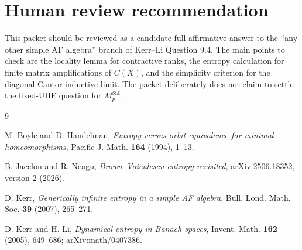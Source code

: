 \documentclass[11pt]{article}
\theoremstyle{remark}
\newcommand{\Z}{\mathbb Z}
\begin{document}
\section{Human review recommendation}

This packet should be reviewed as a candidate full affirmative answer to the
``any other simple AF algebra'' branch of Kerr--Li Question 9.4.  The main
points to check are the locality lemma for contractive ranks, the entropy
calculation for finite matrix amplifications of \(C(X)\), and the simplicity
criterion for the diagonal Cantor inductive limit.  The packet deliberately
does not claim to settle the fixed-UHF question for \(M_p^{\otimes\Z}\).

\begin{thebibliography}{9}

M. Boyle and D. Handelman,
\emph{Entropy versus orbit equivalence for minimal homeomorphisms},
Pacific J. Math. \textbf{164} (1994), 1--13.

B. Jacelon and R. Neagu,
\emph{Brown--Voiculescu entropy revisited},
arXiv:2506.18352, version 2 (2026).

D. Kerr,
\emph{Generically infinite entropy in a simple AF algebra},
Bull. Lond. Math. Soc. \textbf{39} (2007), 265--271.

D. Kerr and H. Li,
\emph{Dynamical entropy in Banach spaces},
Invent. Math. \textbf{162} (2005), 649--686;
arXiv:math/0407386.

\end{thebibliography}
\end{document}
